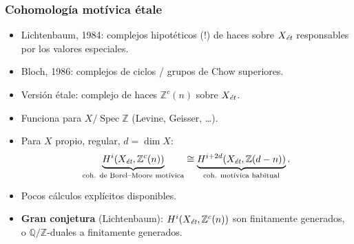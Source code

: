 \documentclass[handout]{beamer}
\newcommand{\QQ}{\mathbb{Q}}
\newcommand{\ZZ}{\mathbb{Z}}
\DeclareMathOperator{\Spec}{Spec}
\newcommand{\et}{\text{\it ét}}
\begin{document}

\begin{frame}
  \frametitle{Cohomología motívica étale}

  \begin{itemize}
  \item<2-> Lichtenbaum, 1984: complejos hipotéticos (!) de haces sobre $X_\et$
    responsables por los valores especiales.

  \item<3-> Bloch, 1986: complejos de ciclos / grupos de Chow superiores.

  \item<4-> Versión étale: complejo de haces $\ZZ^c (n)$ sobre $X_\et$.

  \item<5-> Funciona para $X / \Spec \ZZ$ (Levine, Geisser, \ldots).

  \item<6-> Para $X$ propio, regular, $d = \dim X$:
    \[ \underbrace{H^i (X_\et, \ZZ^c (n))}_{\text{coh. de Borel--Moore motívica}} \cong
      \underbrace{H^{i+2d} (X_\et, \ZZ (d-n))}_{\text{coh. motívica habitual}}. \]

  \item<7-> Pocos cálculos explícitos disponibles.

  \item<8-> \textbf{Gran conjetura} (Lichtenbaum):
    $H^i (X_\et, \ZZ^c (n))$ son finitamente generados,
    o $\QQ/\ZZ$-duales a finitamente generados.
  \end{itemize}
\end{frame}

\end{document}

